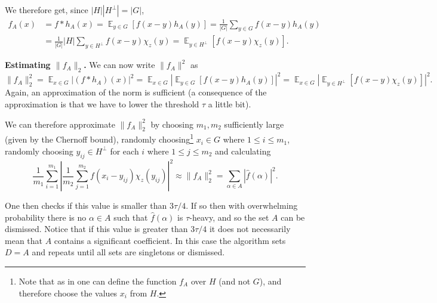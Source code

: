\documentclass[11pt]{article}
\theoremstyle{definition}
\DeclareMathOperator*{\E}{\mathbb{E}}
\begin{document}
We therefore get, since $|H| |H^\perp| = |G|$,
\begin{equation*}
    \begin{split}
        f_A(x) & = f \ast h_A(x) = \E_{y \in G}\left[f(x-y)h_A(y)\right] = \frac{1}{|G|} \sum_{y \in G} f(x-y)h_A(y) \\
        & = \frac{1}{|G|} |H| \sum_{y \in H^\perp} f(x-y)\chi_z(y) = \E_{y \in H^\perp}\left[f(x-y)\chi_z(y)\right] .
    \end{split}
\end{equation*}


\noindent \textbf{Estimating $\| f_A \|_2$.} We can now write $\|f_A\|^2$ as
\[ \| f_A \|_2^2 =  \E_{x\in G}\left|(f * h_A)(x)\right|^2 = \E_{x\in G}\left|\E_{y\in G}\left[f(x-y)h_A(y)\right]\right|^2 = \E_{x\in G}\left| \E_{y\in H^\perp}\left[f(x-y)\chi_z(y)\right]\right|^2 . \]
Again, an approximation of the norm is sufficient (a consequence of the approximation is that we have to lower the threshold $\tau$ a little bit).

We can therefore approximate $\| f_A\|_2^2$ by choosing $m_1, m_2$ sufficiently large (given by the Chernoff bound), randomly choosing\footnote{Note that as in \cite{KM,Mansour92} one can define the function $f_A$ over $H$ (and not $G$), and therefore choose the values $x_i$ from $H$.} $x_i\in G$ where $1\leq i \leq m_1$, randomly choosing $y_{ij}\in H^\perp$ for each $i$ where $1\leq j \leq m_2$ and calculating
\begin{equation}\label{eq_STF}
    \frac{1}{m_1}\sum_{i = 1}^{m_1}\left|\frac{1}{m_2}\sum_{j=1}^{m_2}f(x_i-y_{ij})\chi_z(y_{ij})\right|^2 \approx \| f_A\|_2^2 = \sum_{\alpha \in A} |\widehat{f}(\alpha)|^2 .
\end{equation}

One then checks if this value is smaller than $3\tau /4$. If so then with overwhelming probability there is no $\alpha \in A$ such that $\widehat{f}(\alpha)$ is $\tau$-heavy, and so the set $A$ can be dismissed. Notice that if this value is greater than $3\tau /4$ it does not necessarily mean that $A$ contains a significant coefficient. In this case the algorithm sets $D=A$ and repeats until all sets are singletons or dismissed.
\end{document}
